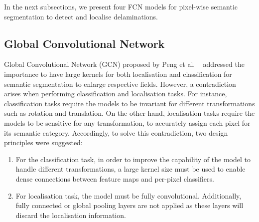 \documentclass[runningheads]{llncs}
\begin{document}
In the next subsections, we present four FCN models for pixel-wise semantic segmentation to detect and localise delaminations.
\subsection{Global Convolutional Network}
Global Convolutional Network (GCN) proposed by Peng et al. 
~\cite{Peng2017} addressed the importance to have large kernels for both 
localisation and classification for semantic segmentation to enlarge 
respective fields.
However, a contradiction arises when performing classification and localisation 
tasks. 
For instance, classification tasks require the models to be invariant for 
different transformations such as rotation and translation.
On the other hand, localisation tasks require the models to be sensitive for 
any transformation, to accurately assign each pixel for its semantic category.
Accordingly, to solve this contradiction, two design principles were suggested: 
\begin{enumerate}
	\item For the classification task, in order to improve the capability of 
	the model to handle different transformations, a large kernel size must be 
	used to enable dense connections between feature maps and per-pixel 
	classifiers.
	\item For localisation task, the model must be fully convolutional. 
	Additionally, fully connected or global pooling layers are not applied as 
	these layers will discard the localisation information. 
\end{enumerate}
\end{document}
